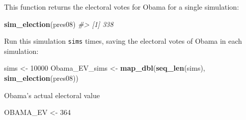 \documentclass[]{book}
\newenvironment{Shaded}{\begin{snugshade}}{\end{snugshade}}
\newcommand{\CommentTok}[1]{\textcolor[rgb]{0.56,0.35,0.01}{\textit{#1}}}
\newcommand{\ControlFlowTok}[1]{\textcolor[rgb]{0.13,0.29,0.53}{\textbf{#1}}}
\newcommand{\DataTypeTok}[1]{\textcolor[rgb]{0.13,0.29,0.53}{#1}}
\newcommand{\DecValTok}[1]{\textcolor[rgb]{0.00,0.00,0.81}{#1}}
\newcommand{\KeywordTok}[1]{\textcolor[rgb]{0.13,0.29,0.53}{\textbf{#1}}}
\newcommand{\NormalTok}[1]{#1}
\newcommand{\OperatorTok}[1]{\textcolor[rgb]{0.81,0.36,0.00}{\textbf{#1}}}
\newcommand{\StringTok}[1]{\textcolor[rgb]{0.31,0.60,0.02}{#1}}
\theoremstyle{definition}
\theoremstyle{definition}
\theoremstyle{definition}
\theoremstyle{remark}
\begin{document}
\begin{Shaded}
\end{Shaded}

This function returns the electoral votes for Obama for a single
simulation:

\begin{Shaded}
\begin{Highlighting}[]
\KeywordTok{sim_election}\NormalTok{(pres08)}
\CommentTok{#> [1] 338}
\end{Highlighting}
\end{Shaded}

Run this simulation \texttt{sims} times, saving the electoral votes of
Obama in each simulation:

\begin{Shaded}
\begin{Highlighting}[]
\NormalTok{sims <-}\StringTok{ }\DecValTok{10000}
\NormalTok{Obama_EV_sims <-}\StringTok{ }\KeywordTok{map_dbl}\NormalTok{(}\KeywordTok{seq_len}\NormalTok{(sims), }\OperatorTok{~}\StringTok{ }\KeywordTok{sim_election}\NormalTok{(pres08))}
\end{Highlighting}
\end{Shaded}

Obama's actual electoral value

\begin{Shaded}
\begin{Highlighting}[]
\NormalTok{OBAMA_EV <-}\StringTok{ }\DecValTok{364}
\end{Highlighting}
\end{Shaded}
\end{document}
